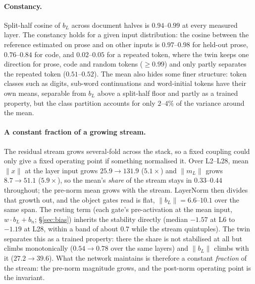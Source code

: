 \documentclass[11pt]{article}
\newcommand{\bl}{b_L}
\begin{document}
\paragraph{Constancy.} Split-half cosine of $\bl$ across document
halves is $0.94$--$0.99$ at every measured layer. The constancy holds
for a given input distribution: the cosine between the reference
estimated on prose and on other inputs is $0.97$--$0.98$ for held-out
prose, $0.76$--$0.84$ for code, and $0.02$--$0.05$ for a repeated token,
where the twin keeps one direction for prose, code and random tokens
($\geq 0.99$) and only partly separates the repeated token
($0.51$--$0.52$). The mean also hides some
finer structure: token classes such as digits, sub-word continuations
and word-initial tokens have their own means, separable from $\bl$
above a split-half floor and partly as a trained property, but the class
partition accounts for only $2$--$4\%$ of the variance around the mean.

\paragraph{A constant fraction of a growing stream.} The
residual stream grows several-fold across the stack, so a fixed
coupling could only give a fixed operating point if something
normalised it. Over L2--L28, mean $\|x\|$ at the layer input grows
$25.9 \to 131.9$ ($5.1\times$) and $\|m_L\|$ grows $8.7 \to 51.1$
($5.9\times$), so the mean's \emph{share} of the stream stays in
$0.33$--$0.44$ throughout; the pre-norm mean grows with the stream. LayerNorm then divides that growth
out, and the object gates read is flat, $\|\bl\| = 6.6$--$10.1$ over
the same span. The resting term (each gate's pre-activation at the mean
input, $w\cdot\bl + b_n$; \S\ref{sec:bias}) inherits the stability
directly (median $-1.57$ at L6 to $-1.19$ at L28, within a band of about
$0.7$ while the stream quintuples). The twin
separates this as a trained property: there the share is not
stabilised at all but climbs monotonically ($0.54 \to 0.78$ over the
same layers) and $\|\bl\|$ climbs with it ($27.2 \to 39.6$). What the network maintains is therefore a constant \emph{fraction}
of the stream: the pre-norm magnitude grows, and the post-norm operating
point is the invariant.
\end{document}

